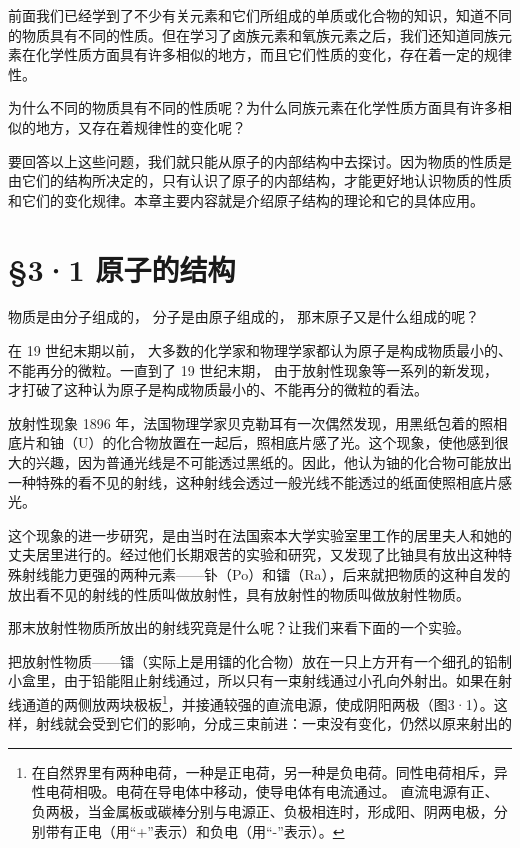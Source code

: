 前面我们已经学到了不少有关元素和它们所组成的单质或化合物的知识，知道不同的物质具有不同的性质。但在学习了卤族元素和氧族元素之后，我们还知道同族元素在化学性质方面具有许多相似的地方，而且它们性质的变化，存在着一定的规律性。

为什么不同的物质具有不同的性质呢？为什么同族元素在化学性质方面具有许多相似的地方，又存在着规律性的变化呢？

要回答以上这些问题，我们就只能从原子的内部结构中去探讨。因为物质的性质是由它们的结构所决定的，只有认识了原子的内部结构，才能更好地认识物质的性质和它们的变化规律。本章主要内容就是介绍原子结构的理论和它的具体应用。

\section{§3·1 原子的结构}

物质是由分子组成的， 分子是由原子组成的， 那末原子又是什么组成的呢？

在 19 世纪末期以前，
大多数的化学家和物理学家都认为原子是构成物质最小的、不能再分的微粒。一直到了
19 世纪末期， 由于放射性现象等一系列的新发现，
才打破了这种认为原子是构成物质最小的、不能再分的微粒的看法。

放射性现象 1896
年，法国物理学家贝克勒耳有一次偶然发现，用黑纸包着的照相底片和铀（U）的化合物放置在一起后，照相底片感了光。这个现象，使他感到很大的兴趣，因为普通光线是不可能透过黑纸的。因此，他认为铀的化合物可能放出一种特殊的看不见的射线，这种射线会透过一般光线不能透过的纸面使照相底片感光。

这个现象的进一步研究，是由当时在法国索本大学实验室里工作的居里夫人和她的丈夫居里进行的。经过他们长期艰苦的实验和研究，又发现了比铀具有放出这种特殊射线能力更强的两种元素------钋（Po）和镭（Ra），后来就把物质的这种自发的放出看不见的射线的性质叫做放射性，具有放射性的物质叫做放射性物质。

那末放射性物质所放出的射线究竟是什么呢？让我们来看下面的一个实验。

把放射性物质------镭（实际上是用镭的化合物）放在一只上方开有一个细孔的铅制小盒里，由于铅能阻止射线通过，所以只有一束射线通过小孔向外射出。如果在射线通道的两侧放两块极板\footnote{在自然界里有两种电荷，一种是正电荷，另一种是负电荷。同性电荷相斥，异性电荷相吸。电荷在导电体中移动，使导电体有电流通过。
  直流电源有正、负两极，当金属板或碳棒分别与电源正、负极相连时，形成阳、阴两电极，分别带有正电（用``+''表示）和负电（用``-''表示）。}，并接通较强的直流电源，使成阴阳两极（图3·1）。这样，射线就会受到它们的影响，分成三束前进：一束没有变化，仍然以原来射出的

